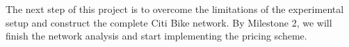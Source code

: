 \documentclass[times, 10pt,twocolumn]{article}
\begin{document}
The next step of this project is to overcome the limitations of the experimental setup and construct the complete Citi Bike network. By Milestone 2, we will finish the network analysis and start implementing the pricing scheme.

%
%
%
%
%
%
\end{document}
